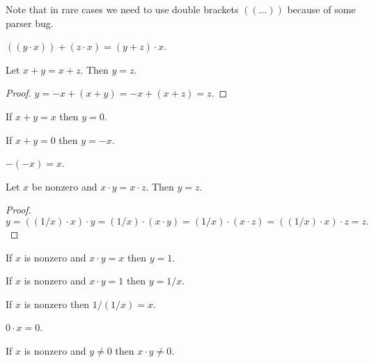\documentclass{article}
\begin{document}
Note that in rare cases we need to use double brackets
$((\dots))$ because
of some parser bug.
\begin{forthel}
\begin{proposition}
$((y \cdot x)) + (z \cdot x) = (y + z) \cdot x$.
\end{proposition}

\begin{proposition}
Let $x + y = x + z$. Then $y = z$.
\end{proposition}
\begin{proof}
$y = -x + (x+y) = -x + (x+z) = z$.
\end{proof}

\begin{proposition}
If $x + y = x$ then $y = 0$.
\end{proposition}

\begin{proposition}
If $x + y = 0$ then $y = -x$.
\end{proposition}

\begin{proposition}
$-(-x) = x$.
\end{proposition}


\begin{proposition}
Let $x$ be nonzero and $x \cdot y = x \cdot z$.
Then $y = z$.
\end{proposition}
\begin{proof}
$ y = ((1/x) \cdot x) \cdot y = (1/x) \cdot (x \cdot y) =
(1/x) \cdot (x \cdot z) = ((1/x) \cdot x) \cdot z = z.$
\end{proof}

\begin{proposition}
If $x$ is nonzero and $x \cdot y = x$ then $y = 1$.
\end{proposition}

\begin{proposition}
If $x$ is nonzero and $x \cdot y = 1$ then $y = 1/x$.
\end{proposition}

\begin{proposition}
If $x$ is nonzero then $1/(1/x) = x$.
\end{proposition}

\begin{proposition}
$0 \cdot x = 0$.
\end{proposition}

\begin{proposition}
If $x$ is nonzero and $y \neq 0$ then $x \cdot y \neq 0$.
\end{proposition}


\end{forthel}
\end{document}
